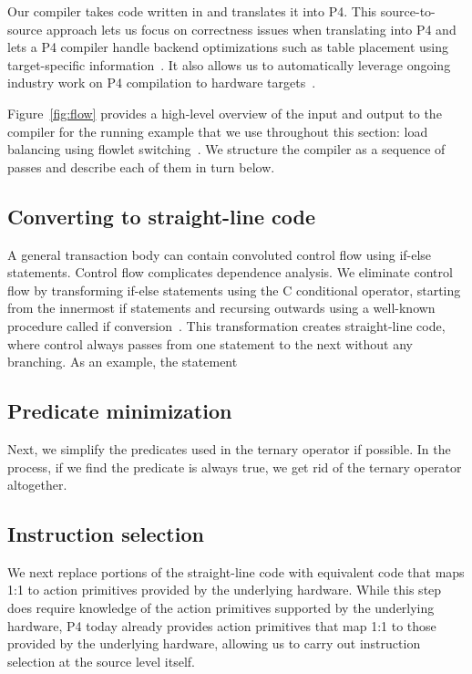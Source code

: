 Our compiler takes code written in \pktlanguage and translates it into P4. This
source-to-source approach lets us focus on correctness issues when translating
\pktlanguage into P4 and lets a P4 compiler handle backend optimizations such
as table placement using target-specific information~\cite{lavanya_compiler}.
It also allows us to automatically leverage ongoing industry work on P4
compilation to hardware targets~\cite{xilinx}.

Figure~\ref{fig:flow} provides a high-level overview of the input and output to
the compiler for the running example that we use throughout this section: load
balancing using flowlet switching~\cite{flowlets}.  We structure the compiler
as a sequence of passes and describe each of them in turn below. 

\subsection{Converting to straight-line code}
A general transaction body can contain convoluted control flow using if-else
statements. Control flow complicates dependence analysis. We eliminate control
flow by transforming if-else statements using the C conditional operator,
starting from the innermost if statements and recursing outwards using a
well-known procedure called if conversion~\cite{allen_if_conversion}.  This
transformation creates straight-line code, where control always passes from one
statement to the next without any branching. As an example, the statement


\subsection{Predicate minimization}
Next, we simplify the predicates used in the ternary operator if possible.  In
the process, if we find the predicate is always true, we get rid of the ternary
operator altogether.

\subsection{Instruction selection}
We next replace portions of the straight-line code with equivalent code that
maps 1:1 to action primitives provided by the underlying hardware. While this
step does require knowledge of the action primitives supported by the
underlying hardware, P4 today already provides action primitives that map
1:1 to those provided by the underlying hardware, allowing us to carry out
instruction selection at the source level itself.


